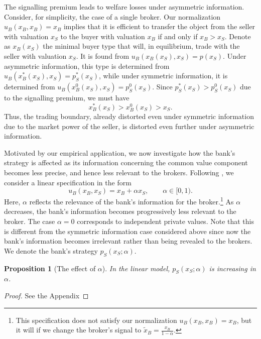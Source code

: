 \documentclass[11pt,twopage]{article}
\newtheorem{proposition}{Proposition}
{\bf}{\it}
\begin{document}
The signalling premium leads to welfare losses under asymmetric information. Consider, for simplicity, the case of a single broker. Our normalization $u_B(x_B,x_B) = x_B$ implies that it is efficient to transfer the object from the seller with valuation $x_S$ to the buyer with valuation $x_B$ if and only if $x_B>x_S$. Denote as $x_B(x_S)$ the minimal buyer type that will, in equilibrium, trade with the seller with valuation $x_S$. It is found from $u_B(x_B(x_S),x_S) = p(x_S)$. Under asymmetric information, this type is determined from $u_B(x_B^*(x_S),x_S) = p_S^*(x_S)$, while under symmetric information, it is determined from $u_B(x_B^0(x_S),x_S) = p_S^0(x_S)$. Since $p_S^*(x_S)>p_S^0(x_S)$ due to the signalling premium, we must have \[ x_B^*(x_S)>x_B^0(x_S)>x_S .\]
Thus, the trading boundary, already distorted even under symmetric information due to the market power of the seller, is distorted even further under asymmetric information.

Motivated by our empirical application, we now investigate how the bank's strategy is affected as its information concerning the common value component becomes less precise, and hence less relevant to the brokers. Following  \cite{cai2007reserve}, we consider a linear specification in the form
\[ u_B(x_B,x_S) = x_B+\alpha x_S, \quad\quad \alpha \in [0,1).\]
Here, $\alpha$ reflects the relevance of the bank's information for the broker.\footnote{This specification does not satisfy our normalization $u_B(x_B,x_B) = x_B$, but it will if we change the broker's signal to $\tilde x_B = \frac{x_B}{1-\alpha}$.}  As $\alpha$ decreases, the bank's information becomes progressively less relevant to the broker. The case $\alpha = 0$ corresponds to independent private values. Note that this is different from the symmetric information case considered above since now the bank's information becomes irrelevant rather than being revealed to the brokers. We denote the bank's strategy $p_S(x_S;\alpha)$.
\begin{proposition}[The effect of $\alpha$]\label{prop:slope}
In the linear model, $p_S(x_S;\alpha)$ is increasing in $\alpha$.
\end{proposition}
\begin{proof}See the Appendix
\end{proof}
\end{document}
